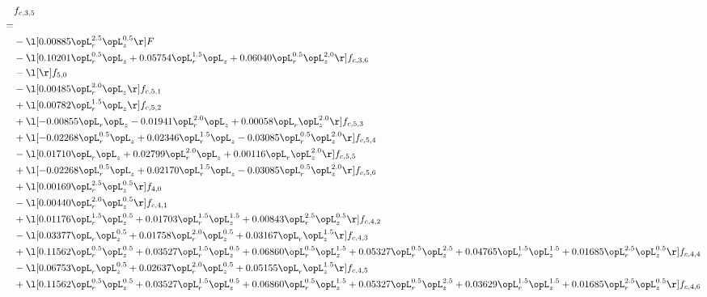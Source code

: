 \begin{alignat}{2} 
\label{eq:f_35_2} 
& f_{c,3,5} \nonumber \\ 
 = \\ 
& - \l[  0.00885 \opL_r^{2.5} \opL_z^{0.5}  \r] F \nonumber \\ 
& - \l[  0.10201 \opL_r^{0.5} \opL_z +  0.05754 \opL_r^{1.5} \opL_z +  0.06040 \opL_r^{0.5} \opL_z^{2.0}  \r] f_{c,3,6} \nonumber \\ 
& - \l[  \r] f_{5,0} \nonumber \\ 
& - \l[  0.00485 \opL_r^{2.0} \opL_z  \r] f_{c,5,1} \nonumber \\ 
& + \l[  0.00782 \opL_r^{1.5} \opL_z  \r] f_{c,5,2} \nonumber \\ 
& + \l[  -0.00855 \opL_r \opL_z   -0.01941 \opL_r^{2.0} \opL_z +  0.00058 \opL_r \opL_z^{2.0}  \r] f_{c,5,3} \nonumber \\ 
& + \l[  -0.02268 \opL_r^{0.5} \opL_z +  0.02346 \opL_r^{1.5} \opL_z   -0.03085 \opL_r^{0.5} \opL_z^{2.0}  \r] f_{c,5,4} \nonumber \\ 
& - \l[  0.01710 \opL_r \opL_z +  0.02799 \opL_r^{2.0} \opL_z +  0.00116 \opL_r \opL_z^{2.0}  \r] f_{c,5,5} \nonumber \\ 
& + \l[  -0.02268 \opL_r^{0.5} \opL_z +  0.02170 \opL_r^{1.5} \opL_z   -0.03085 \opL_r^{0.5} \opL_z^{2.0}  \r] f_{c,5,6} \nonumber \\ 
& + \l[  0.00169 \opL_r^{2.5} \opL_z^{0.5}  \r] f_{4,0} \nonumber \\ 
& - \l[  0.00440 \opL_r^{2.0} \opL_z^{0.5}  \r] f_{c,4,1} \nonumber \\ 
& + \l[  0.01176 \opL_r^{1.5} \opL_z^{0.5} +  0.01703 \opL_r^{1.5} \opL_z^{1.5} +  0.00843 \opL_r^{2.5} \opL_z^{0.5}  \r] f_{c,4,2} \nonumber \\ 
& - \l[  0.03377 \opL_r \opL_z^{0.5} +  0.01758 \opL_r^{2.0} \opL_z^{0.5} +  0.03167 \opL_r \opL_z^{1.5}  \r] f_{c,4,3} \nonumber \\ 
& + \l[  0.11562 \opL_r^{0.5} \opL_z^{0.5} +  0.03527 \opL_r^{1.5} \opL_z^{0.5} +  0.06860 \opL_r^{0.5} \opL_z^{1.5} +  0.05327 \opL_r^{0.5} \opL_z^{2.5} +  0.04765 \opL_r^{1.5} \opL_z^{1.5} +  0.01685 \opL_r^{2.5} \opL_z^{0.5}  \r] f_{c,4,4} \nonumber \\ 
& - \l[  0.06753 \opL_r \opL_z^{0.5} +  0.02637 \opL_r^{2.0} \opL_z^{0.5} +  0.05155 \opL_r \opL_z^{1.5}  \r] f_{c,4,5} \nonumber \\ 
& + \l[  0.11562 \opL_r^{0.5} \opL_z^{0.5} +  0.03527 \opL_r^{1.5} \opL_z^{0.5} +  0.06860 \opL_r^{0.5} \opL_z^{1.5} +  0.05327 \opL_r^{0.5} \opL_z^{2.5} +  0.03629 \opL_r^{1.5} \opL_z^{1.5} +  0.01685 \opL_r^{2.5} \opL_z^{0.5}  \r] f_{c,4,6} \nonumber \\ 

\end{alignat}
